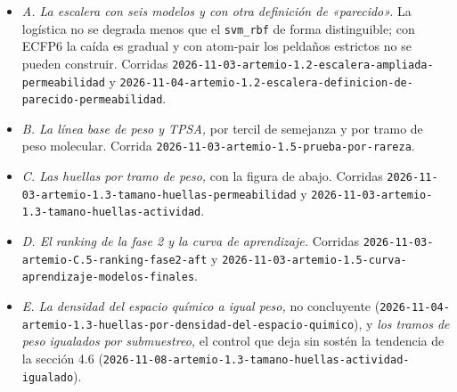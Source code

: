 \documentclass[letterpaper,11pt]{article}
\providecommand{\tightlist}{\setlength{\itemsep}{0pt}\setlength{\parskip}{0pt}}
\begin{document}
\begin{itemize}
\tightlist
\item
  \emph{A. La escalera con seis modelos y con otra definición de «parecido».} La logística no se degrada menos que el \texttt{svm\_rbf} de forma distinguible; con ECFP6 la caída es gradual y con atom-pair los peldaños estrictos no se pueden construir. Corridas \texttt{2026-\allowbreak{}11-\allowbreak{}03-\allowbreak{}artemio-\allowbreak{}1.2-\allowbreak{}escalera-\allowbreak{}ampliada-\allowbreak{}permeabilidad} y \texttt{2026-\allowbreak{}11-\allowbreak{}04-\allowbreak{}artemio-\allowbreak{}1.2-\allowbreak{}escalera-\allowbreak{}definicion-\allowbreak{}de-\allowbreak{}parecido-\allowbreak{}permeabilidad}.
\item
  \emph{B. La línea base de peso y TPSA,} por tercil de semejanza y por tramo de peso molecular. Corrida \texttt{2026-\allowbreak{}11-\allowbreak{}03-\allowbreak{}artemio-\allowbreak{}1.5-\allowbreak{}prueba-\allowbreak{}por-\allowbreak{}rareza}.
\item
  \emph{C. Las huellas por tramo de peso,} con la figura de abajo. Corridas \texttt{2026-\allowbreak{}11-\allowbreak{}03-\allowbreak{}artemio-\allowbreak{}1.3-\allowbreak{}tamano-\allowbreak{}huellas-\allowbreak{}permeabilidad} y \texttt{2026-\allowbreak{}11-\allowbreak{}03-\allowbreak{}artemio-\allowbreak{}1.3-\allowbreak{}tamano-\allowbreak{}huellas-\allowbreak{}actividad}.
\item
  \emph{D. El ranking de la fase 2 y la curva de aprendizaje.} Corridas \texttt{2026-\allowbreak{}11-\allowbreak{}03-\allowbreak{}artemio-\allowbreak{}C.5-\allowbreak{}ranking-\allowbreak{}fase2-\allowbreak{}aft} y \texttt{2026-\allowbreak{}11-\allowbreak{}03-\allowbreak{}artemio-\allowbreak{}1.5-\allowbreak{}curva-\allowbreak{}aprendizaje-\allowbreak{}modelos-\allowbreak{}finales}.
\item
  \emph{E. La densidad del espacio químico a igual peso,} no concluyente (\texttt{2026-\allowbreak{}11-\allowbreak{}04-\allowbreak{}artemio-\allowbreak{}1.3-\allowbreak{}huellas-\allowbreak{}por-\allowbreak{}densidad-\allowbreak{}del-\allowbreak{}espacio-\allowbreak{}quimico}), y \emph{los tramos de peso igualados por submuestreo,} el control que deja sin sostén la tendencia de la sección 4.6 (\texttt{2026-\allowbreak{}11-\allowbreak{}08-\allowbreak{}artemio-\allowbreak{}1.3-\allowbreak{}tamano-\allowbreak{}huellas-\allowbreak{}actividad-\allowbreak{}igualado}).
\end{itemize}
\end{document}
